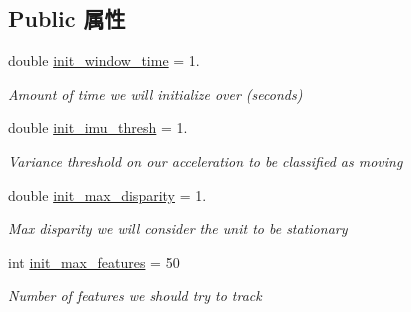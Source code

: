 \subsection*{Public 属性}
\begin{DoxyCompactItemize}
\item 
\mbox{\label{structov__init_1_1InertialInitializerOptions_a8fc45471d64b463b54b49fafc2372391}} 
double \hyperlink{structov__init_1_1InertialInitializerOptions_a8fc45471d64b463b54b49fafc2372391}{init\+\_\+window\+\_\+time} = 1.
\begin{DoxyCompactList}\small\item\em Amount of time we will initialize over (seconds) \end{DoxyCompactList}\item 
\mbox{\label{structov__init_1_1InertialInitializerOptions_ae52064e908cacf87016bb56162890b5c}} 
double \hyperlink{structov__init_1_1InertialInitializerOptions_ae52064e908cacf87016bb56162890b5c}{init\+\_\+imu\+\_\+thresh} = 1.
\begin{DoxyCompactList}\small\item\em Variance threshold on our acceleration to be classified as moving \end{DoxyCompactList}\item 
\mbox{\label{structov__init_1_1InertialInitializerOptions_a2ccadc84d3b4085f3d639efacc1850c6}} 
double \hyperlink{structov__init_1_1InertialInitializerOptions_a2ccadc84d3b4085f3d639efacc1850c6}{init\+\_\+max\+\_\+disparity} = 1.
\begin{DoxyCompactList}\small\item\em Max disparity we will consider the unit to be stationary \end{DoxyCompactList}\item 
\mbox{\label{structov__init_1_1InertialInitializerOptions_a442ed53391151e45582a365c057ac492}} 
int \hyperlink{structov__init_1_1InertialInitializerOptions_a442ed53391151e45582a365c057ac492}{init\+\_\+max\+\_\+features} = 50
\begin{DoxyCompactList}\small\item\em Number of features we should try to track \end{DoxyCompactList}\item 

\end{DoxyCompactItemize}
